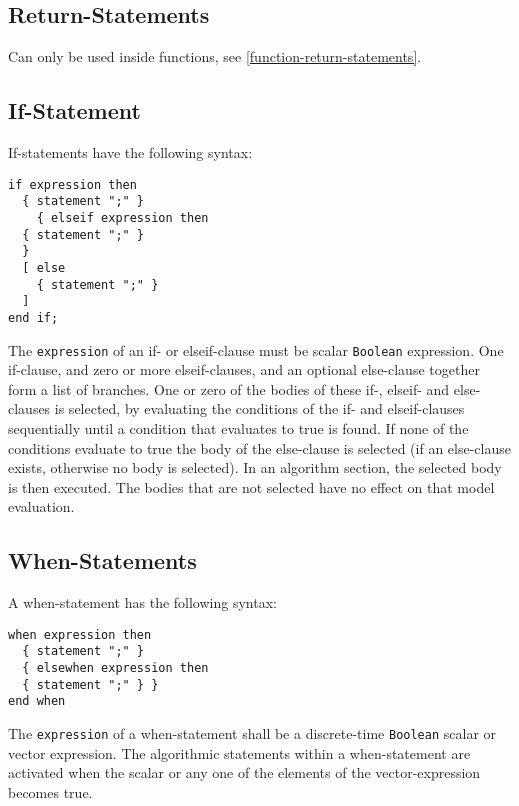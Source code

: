 \subsection{Return-Statements}\label{return-statements}

Can only be used inside functions, see \cref{function-return-statements}.

\subsection{If-Statement}\label{if-statement}

If-statements have the following syntax:
\begin{lstlisting}[language=grammar]
if expression then
  { statement ";" }
    { elseif expression then
  { statement ";" }
  }
  [ else
    { statement ";" }
  ]
end if;
\end{lstlisting}

The \lstinline!expression! of an if- or elseif-clause must be scalar \lstinline!Boolean! expression.  One if-clause, and zero or more elseif-clauses, and an optional else-clause together form a list of branches.  One or zero of the bodies of these if-, elseif- and else-clauses is selected, by evaluating the conditions of the if- and elseif-clauses sequentially until a condition that evaluates to true is found.  If none of the conditions evaluate to true the body of the else-clause is selected (if an else-clause exists, otherwise no body is selected).  In an algorithm section, the selected body is then executed.  The bodies that are not selected have no effect on that model evaluation.

\subsection{When-Statements}\label{when-statements}

A when-statement has the following syntax:
\begin{lstlisting}[language=grammar]
when expression then
  { statement ";" }
  { elsewhen expression then
  { statement ";" } }
end when
\end{lstlisting}
The \lstinline!expression! of a when-statement shall be a discrete-time \lstinline!Boolean! scalar or vector expression.  The algorithmic statements within a when-statement are activated when the scalar or any one of the elements of the vector-expression becomes true.

